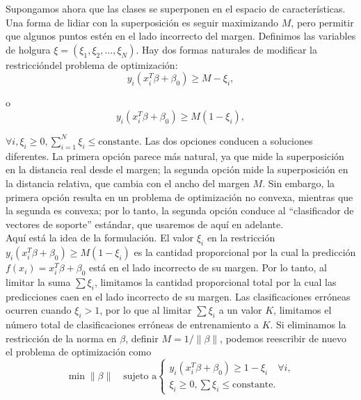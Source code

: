 Supongamos ahora que las clases se superponen en el espacio de características. Una forma de lidiar con la superposición es seguir maximizando $M$, pero permitir que algunos puntos estén en el lado incorrecto del margen. Definimos las variables de holgura $\xi = (\xi_1, \xi_2, \ldots, \xi_N)$. Hay dos formas naturales de modificar la restriccióndel problema de optimización:
\begin{equation}
y_i (x_i^T \beta + \beta_0) \geq M - \xi_i,
\end{equation}

\noindent o
\begin{equation}
y_i (x_i^T \beta + \beta_0) \geq M (1 - \xi_i),
\end{equation}

$\forall i, \xi_i \geq 0, \sum_{i=1}^N \xi_i \leq \text{constante}$. Las dos opciones conducen a soluciones diferentes. La primera opción parece más natural, ya que mide la superposición en la distancia real desde el margen; la segunda opción mide la superposición en la distancia relativa, que cambia con el ancho del margen $M$. Sin embargo, la primera opción resulta en un problema de optimización no convexa, mientras que la segunda es convexa; por lo tanto, la segunda opción conduce al ``clasificador de vectores de soporte'' estándar, que usaremos de aquí en adelante. \\

Aquí está la idea de la formulación. El valor $\xi_i$ en la restricción $y_i (x_i^T \beta + \beta_0) \geq M (1 - \xi_i)$ es la cantidad proporcional por la cual la predicción $f(x_i) = x_i^T \beta + \beta_0$ está en el lado incorrecto de su margen. Por lo tanto, al limitar la suma $\sum \xi_i$, limitamos la cantidad proporcional total por la cual las predicciones caen en el lado incorrecto de su margen. Las clasificaciones erróneas ocurren cuando $\xi_i > 1$, por lo que al limitar $\sum \xi_i$ a un valor $K$, limitamos el número total de clasificaciones erróneas de entrenamiento a $K$.
Si eliminamos la restricción de la norma en $\beta$, definir $M = 1/\|\beta\|$, podemos reescribir de nuevo el problema de optimización como 
\begin{equation}
\min \|\beta\| \quad \text{sujeto a}
\begin{cases}
y_i (x_i^T \beta + \beta_0) \geq 1 - \xi_i \quad \forall i, \\
\xi_i \geq 0, \sum \xi_i \leq \text{constante}.
\end{cases}
\label{eq:12.7}
\end{equation}

